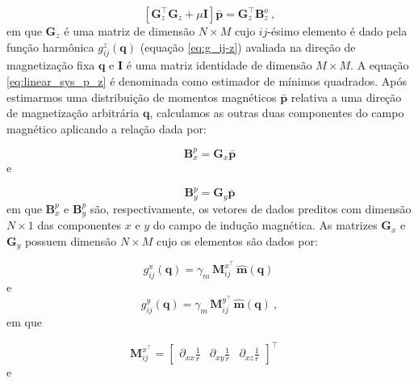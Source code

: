 \begin{equation}
\left[ \mathbf{G}_{z}^{\top} \mathbf{G}_{z} + \mu \mathbf{I} \right] \bar{\mathbf{p}} = \mathbf{G}_{z}^{\top} \mathbf{B}_{z}^{o} \: ,
\label{eq:linear_sys_p_z}
\end{equation}
em que $\mathbf{G}_{z}$ é uma matriz de dimensão $N \times M$ cujo $ij$-ésimo elemento é dado pela função harmônica $g_{ij}^{z}(\mathbf{q})$ (equação \ref{eq:g_ij-z}) avaliada na direção de magnetização fixa $\mathbf{q}$ e $\mathbf{I}$ é uma matriz identidade de dimensão $M \times M$. A equação \ref{eq:linear_sys_p_z} é denominada como estimador de mínimos quadrados. Após estimarmos uma distribuição de momentos magnéticos $\bar{\mathbf{p}}$ relativa a uma direção de magnetização arbitrária $\mathbf{q}$, calculamos as outras duas componentes do campo magnético aplicando a relação dada por:

\begin{equation}
\mathbf{B}_{x}^{p}  = \mathbf{G}_{x} \bar{\mathbf{p}}
\label{eq:pred_vec_x}
\end{equation}
e

\begin{equation}
\mathbf{B}_{y}^{p}  = \mathbf{G}_{y} \bar{\mathbf{p}}
\label{eq:pred_vec_y}
\end{equation}
em que $\mathbf{B}_{x}^{p}$ e $\mathbf{B}_{y}^{p}$ são, respectivamente, os vetores de dados preditos com dimensão $N \times 1$ das componentes $x$ e $y$ do campo de indução magnética. As matrizes $\mathbf{G}_{x}$ e $\mathbf{G}_{y}$ possuem dimensão $N \times M $ cujo os elementos são dados por: 

\begin{equation}
g_{ij}^{x}(\mathbf{q})  = \gamma_m \, \mathbf{M}_{ij}^{x^\top} \, \hat{\mathbf{m}}(\mathbf{q}) \: 
\label{eq:g_ij-x}
\end{equation}
e 
\begin{equation}
g_{ij}^{y}(\mathbf{q})  = \gamma_m \, \mathbf{M}_{ij}^{y^\top} \, \hat{\mathbf{m}}(\mathbf{q}) \: ,
\label{eq:g_ij-y}
\end{equation}
em que 

\begin{equation}
\mathbf{M}_{ij}^{x^\top} = \begin{bmatrix}
\partial_{xx} \frac{1}{r} & 
\partial_{xy} \frac{1}{r} &
\partial_{xz} \frac{1}{r}
\end{bmatrix}^\top \quad 
\label{eq:Mij-matrix-z}
\end{equation}
e 

